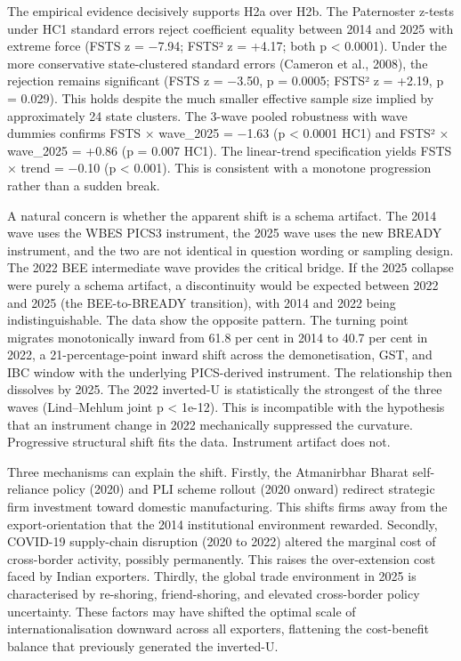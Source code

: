 \documentclass[
  12pt]{article}
\begin{document}
The empirical evidence decisively supports H2a over H2b. The Paternoster
z-tests under HC1 standard errors reject coefficient equality between
2014 and 2025 with extreme force (FSTS z = −7.94; FSTS² z = +4.17; both
p \textless{} 0.0001). Under the more conservative state-clustered
standard errors (Cameron et al., 2008), the rejection remains
significant (FSTS z = −3.50, p = 0.0005; FSTS² z = +2.19, p = 0.029).
This holds despite the much smaller effective sample size implied by
approximately 24 state clusters. The 3-wave pooled robustness with wave
dummies confirms FSTS × wave\_2025 = −1.63 (p \textless{} 0.0001 HC1)
and FSTS² × wave\_2025 = +0.86 (p = 0.007 HC1). The linear-trend
specification yields FSTS × trend = −0.10 (p \textless{} 0.001). This is
consistent with a monotone progression rather than a sudden break.

A natural concern is whether the apparent shift is a schema artifact.
The 2014 wave uses the WBES PICS3 instrument, the 2025 wave uses the new
BREADY instrument, and the two are not identical in question wording or
sampling design. The 2022 BEE intermediate wave provides the critical
bridge. If the 2025 collapse were purely a schema artifact, a
discontinuity would be expected between 2022 and 2025 (the BEE-to-BREADY
transition), with 2014 and 2022 being indistinguishable. The data show
the opposite pattern. The turning point migrates monotonically inward
from 61.8 per cent in 2014 to 40.7 per cent in 2022, a
21-percentage-point inward shift across the demonetisation, GST, and IBC
window with the underlying PICS-derived instrument. The relationship
then dissolves by 2025. The 2022 inverted-U is statistically the
strongest of the three waves (Lind--Mehlum joint p \textless{} 1e-12).
This is incompatible with the hypothesis that an instrument change in
2022 mechanically suppressed the curvature. Progressive structural shift
fits the data. Instrument artifact does not.

Three mechanisms can explain the shift. Firstly, the Atmanirbhar Bharat
self-reliance policy (2020) and PLI scheme rollout (2020 onward)
redirect strategic firm investment toward domestic manufacturing. This
shifts firms away from the export-orientation that the 2014
institutional environment rewarded. Secondly, COVID-19 supply-chain
disruption (2020 to 2022) altered the marginal cost of cross-border
activity, possibly permanently. This raises the over-extension cost
faced by Indian exporters. Thirdly, the global trade environment in 2025
is characterised by re-shoring, friend-shoring, and elevated
cross-border policy uncertainty. These factors may have shifted the
optimal scale of internationalisation downward across all exporters,
flattening the cost-benefit balance that previously generated the
inverted-U.
\end{document}
